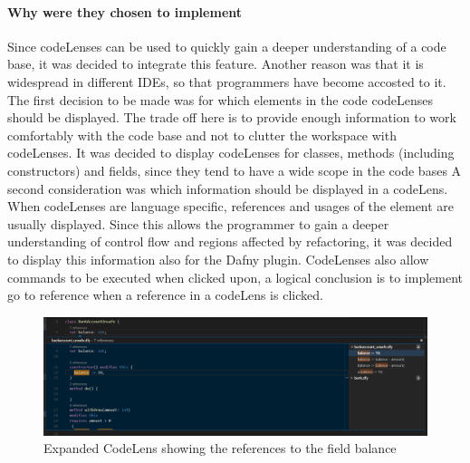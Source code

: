 \paragraph{Why were they chosen to implement}
Since codeLenses can be used to quickly gain a deeper understanding of a code base, it was decided to integrate this feature. Another reason was that it is widespread in different IDEs, so that programmers have become accosted to it. \newline
The first decision to be made was for which elements in the code codeLenses should be displayed. The trade off here is to  provide enough information to work comfortably with the code base and not to clutter the workspace with codeLenses. It was decided to display codeLenses for classes, methods (including constructors) and fields, since they tend to have a wide scope in the code bases \newline
A second consideration was which information should be displayed in a codeLens. When codeLenses are language specific,  references and usages of the element are usually displayed. Since this allows the programmer to gain a deeper understanding of control flow and regions affected by refactoring, it was decided to display this information also for the Dafny plugin. CodeLenses also allow commands to be executed when clicked upon, a logical conclusion is to implement go to reference when a reference in a codeLens is clicked.\newline
\begin{figure}[H]
	\centering
	\includegraphics[width=1\textwidth]{img/codelensesExpanded}
	\caption{Expanded CodeLens showing the references to the field balance}
	\label{fig:agcodelensesexpanded}
\end{figure}
